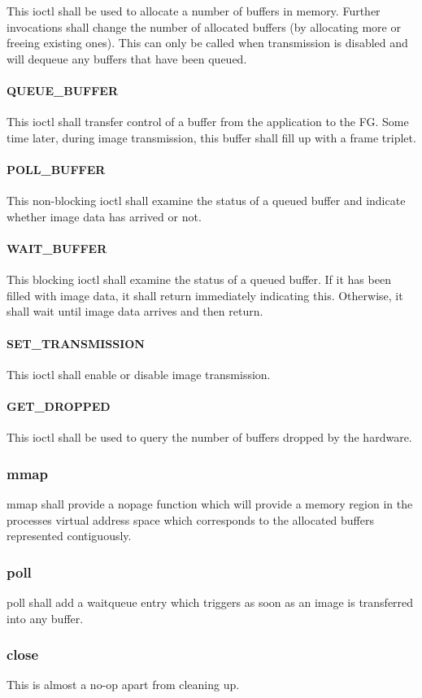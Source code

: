 \documentclass[12pt]{article}
\begin{document}
This ioctl shall be used to allocate a number of buffers in memory. Further invocations shall change the number of allocated buffers (by allocating more or freeing existing ones). This can only be called when transmission is disabled and will dequeue any buffers that have been queued.

\paragraph{QUEUE\_BUFFER}

This ioctl shall transfer control of a buffer from the application to the FG. Some time later, during image transmission, this buffer shall fill up with a frame triplet.

\paragraph{POLL\_BUFFER}

This non-blocking ioctl shall examine the status of a queued buffer and indicate whether image data has arrived or not.

\paragraph{WAIT\_BUFFER}

This blocking ioctl shall examine the status of a queued buffer. If it has been filled with image data, it shall return immediately indicating this. Otherwise, it shall wait until image data arrives and then return.

\paragraph{SET\_TRANSMISSION}

This ioctl shall enable or disable image transmission.

\paragraph{GET\_DROPPED}

This ioctl shall be used to query the number of buffers dropped by the hardware.

\subsubsection{mmap}

mmap shall provide a nopage function which will provide a memory region in the processes virtual address space which corresponds to the allocated buffers represented contiguously.

\subsubsection{poll}

poll shall add a waitqueue entry which triggers as soon as an image is transferred into any buffer.

\subsubsection{close}

This is almost a no-op apart from cleaning up.
\end{document}
